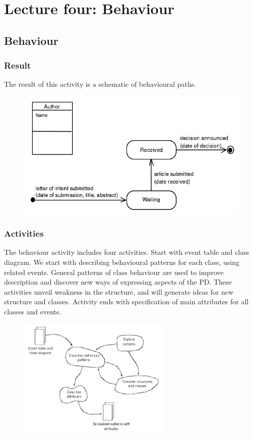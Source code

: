 \chapter{Lecture four: Behaviour}
\section{Behaviour}

\subsection{Result}
The result of this activity is a schematic of behavioural paths.

\begin{figure}[H]
    \centering
    \includegraphics[width=.6\textwidth]{figures/behaviourresult.png}
\end{figure}

\subsection{Activities}

The behaviour activity includes four activities. Start with event table and class diagram. We start with describing behavioural patterns for each class, using related events. General patterns of class behaviour are used to improve description and discover new ways of expressing aspects of the PD. These activities unveil weakness in the structure, and will generate ideas for new structure and classes. Activity ends with specification of main attributes for all classes and events.
\begin{figure}[H]
    \centering
    \includegraphics[width=0.65\textwidth]{figures/behaviouractivities.png}
\end{figure}

